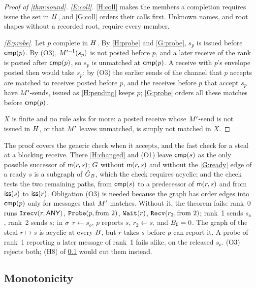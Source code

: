 \begin{proof}[Proof of \cref{thm:sound}]
\emph{\ref{E:coll}.} \ref{H:coll} makes the members a completion requires issue the set in
$H$, and \ref{G:coll} orders their calls first. Unknown names, and root shapes without a
recorded root, require every member.

\emph{\ref{E:probe}.} Let $p$ complete in $H$. By \ref{H:probe} and \ref{G:probe}, $s_p$ is
issued before $\mathsf{cmp}(p)$. By (O3), $M'^{-1}(s_p)$ is not posted before $p$, and a later
receive of the rank is posted after $\mathsf{cmp}(p)$, so $s_p$ is unmatched at $\mathsf{cmp}(p)$. A receive with $p$'s envelope posted then would take $s_p$: by (O3)
the earlier sends of the channel that $p$ accepts are matched to receives posted before $p$,
and the receives before $p$ that accept $s_p$ have $M'$-sends, issued as \ref{H:pending} keeps
$p$; \ref{G:probe} orders all these matches before $\mathsf{cmp}(p)$.

$X$ is finite and no rule asks for more: a posted receive whose $M'$-send is not issued in
$H$, or that $M'$ leaves unmatched, is simply not matched in $X$.
\end{proof}

The proof covers the generic check when it accepts, and the fast check for a steal at a blocking
receive. There \ref{H:changed} and (O1) leave $\mathsf{cmp}(s)$ as the only possible successor of
$\mathsf{m}(r,s)$; $G$ without $\mathsf{m}(r,s)$ and without the \ref{G:ready} edge of a ready $s$
is a subgraph of $\hat G_B$, which the check requires acyclic; and the check tests the two
remaining paths, from $\mathsf{cmp}(s)$ to a predecessor of $\mathsf{m}(r,s)$ and from $\mathsf{iss}(s)$ to
$\mathsf{iss}(r)$. Obligation (O3) is needed because the graph has order edges into $\mathsf{cmp}(p)$ only
for messages that $M'$ matches. Without it, the theorem fails: rank~0 runs
$\texttt{Irecv}(r,\textsf{ANY})$, $\texttt{Probe}(p,\text{from }2)$, $\texttt{Wait}(r)$,
$\texttt{Recv}(r_2,\text{from }2)$; rank~1 sends $s_o$, rank~2 sends $s$; in $\sigma$
$r\gets s_o$, $p$ reports $s$, $r_2\gets s$, and $B_0=0$. The graph of the steal $r\mapsto s$
is acyclic at every $B$, but $r$ takes $s$ before $p$ can report it. A probe of rank~1
reporting a later message of rank~1 fails alike, on the released $s_o$. (O3) rejects both; (H8)
of \cref{app:mono} would cut them instead.

\subsection{Monotonicity}
\label{app:mono}

